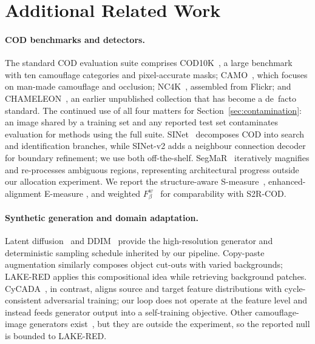 \documentclass{article} %
\begin{document}
\section{Additional Related Work}
\label{app:related}

\paragraph{COD benchmarks and detectors.}
The standard COD evaluation suite comprises COD10K~\cite{fan2022concealed}, a large benchmark
with ten camouflage categories and pixel-accurate masks; CAMO~\cite{le2019anabranch}, which focuses
on man-made camouflage and occlusion; NC4K~\cite{lv2021simultaneously}, assembled from Flickr; and
CHAMELEON~\cite{skurowski2018animal}, an earlier unpublished collection that has become a de~facto
standard. The continued use of all four matters for Section~\ref{sec:contamination}: an image shared
by a training set and any reported test set contaminates evaluation for methods using the full suite.
SINet~\cite{fan2020sinet} decomposes COD into search and identification branches, while SINet-v2
\cite{fan2022concealed} adds a neighbour connection decoder for boundary refinement; we use both
off-the-shelf. SegMaR~\cite{jia2022segment} iteratively magnifies and re-processes ambiguous
regions, representing architectural progress outside our allocation experiment. We report the
structure-aware S-measure~\cite{fan2017structure}, enhanced-alignment E-measure
\cite{fan2018enhanced}, and weighted $F_\beta^w$~\cite{margolin2014evaluate} for comparability
with S2R-COD.

\paragraph{Synthetic generation and domain adaptation.}
Latent diffusion~\cite{rombach2022high} and DDIM~\cite{song2021denoising} provide the high-resolution
generator and deterministic sampling schedule inherited by our pipeline. Copy-paste augmentation
\cite{ghiasi2021simple} similarly composes object cut-outs with varied backgrounds; LAKE-RED applies
this compositional idea while retrieving background patches. CyCADA~\cite{hoffman2018cycada}, in
contrast, aligns source and target feature distributions with cycle-consistent adversarial training;
our loop does not operate at the feature level and instead feeds generator output into a
self-training objective. Other camouflage-image generators exist~\cite{chen2025realcamo}, but they
are outside the experiment, so the reported null is bounded to LAKE-RED.
\end{document}
